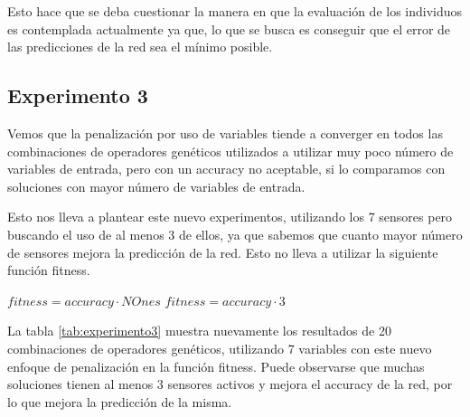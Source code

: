 Esto hace que se deba cuestionar la manera en que la evaluación de los individuos es contemplada actualmente ya que, lo que se busca es conseguir que el error de las predicciones de la red sea el mínimo posible.


\subsection{Experimento 3}

Vemos que la penalización por uso de variables tiende a converger en todos las combinaciones de operadores genéticos utilizados a utilizar muy poco número de variables de entrada, pero con un accuracy no aceptable, si lo comparamos con soluciones con mayor número de variables de entrada.

Esto nos lleva a plantear este nuevo experimentos, utilizando los 7 sensores pero buscando el uso de al menos 3 de ellos, ya que sabemos que cuanto mayor número de sensores mejora la predicción de la red. Esto no lleva a utilizar la siguiente función fitness.

\begin{center}
\begin{algorithmic}
    \State $fitness = accuracy \cdot N Ones$
\Else
    \State $fitness = accuracy \cdot 3$
\EndIf
\end{algorithmic}
\end{center}



La tabla \ref{tab:experimento3} muestra nuevamente los resultados de 20 combinaciones de operadores genéticos,  utilizando 7 variables con este nuevo enfoque de penalización en la función fitness. Puede observarse que muchas soluciones tienen al menos 3 sensores activos y mejora el accuracy de la red, por lo que mejora la predicción de la misma.


